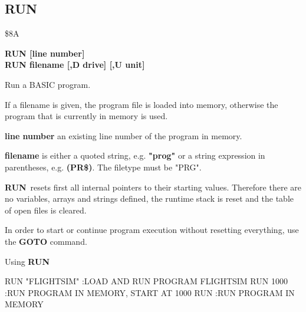 \subsection{RUN}
\begin{description}[leftmargin=3cm,style=nextline]
\item [Token:] \$8A
\item [Format:] {\bf RUN [line number]} \\
                {\bf RUN filename [,D drive] [,U unit] }
\item [Usage:] Run a BASIC program.

   If a filename is given, the program file is loaded into
   memory, otherwise the program that is currently in memory
   is used.

   {\bf line number}
   an existing line number of the program in memory.

   {\bf filename} is either a quoted string, e.g. {\bf "prog"} or
   a string expression in parentheses, e.g. {\bf (PR\$)}.
   The filetype must be "PRG".

   \drivedefinition

   \unitdefinition

   {\bf RUN} resets first all internal pointers to their
   starting values. Therefore there are no variables, arrays
   and strings defined, the runtime stack is reset and the
   table of open files is cleared.

\item [Remarks:]
   In order to start or continue program execution without
   resetting everything, use the {\bf GOTO} command.

\item [Example:] Using {\bf RUN}
\begin{screenoutput}
  RUN "FLIGHTSIM" :LOAD AND RUN PROGRAM FLIGHTSIM
  RUN 1000        :RUN PROGRAM IN MEMORY, START AT 1000
  RUN             :RUN PROGRAM IN MEMORY
\end{screenoutput}
\end{description}


\newpage
